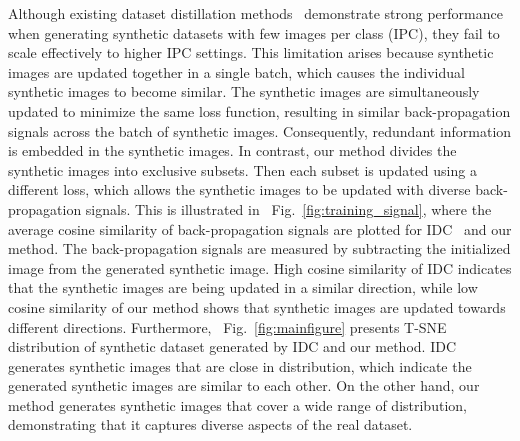 \documentclass{article}
\theoremstyle{plain}
\theoremstyle{definition}
\theoremstyle{remark}
\begin{document}
Although existing dataset distillation methods~\cite{} demonstrate strong performance when generating synthetic datasets with few images per class (IPC), they fail to scale effectively to higher IPC settings.
This limitation arises because synthetic images are updated together in a single batch, which causes the individual synthetic images to become similar. 
The synthetic images are simultaneously updated to minimize the same loss function, resulting in similar back-propagation signals across the batch of synthetic images. 
Consequently, redundant information is embedded in the synthetic images. In contrast, our method divides the synthetic images into exclusive subsets. 
Then each subset is updated using a different loss, which allows the synthetic images to be updated with diverse back-propagation signals. 
This is illustrated in ~Fig.~\ref{fig:training_signal}, where the average cosine similarity of back-propagation signals are plotted for IDC~\cite{} and our method. 
The back-propagation signals are measured by subtracting the initialized image from the generated synthetic image. 
High cosine similarity of IDC indicates that the synthetic images are being updated in a similar direction, while low cosine similarity of our method shows that synthetic images are updated towards different directions. 
Furthermore, ~Fig.~\ref{fig:mainfigure} presents T-SNE~\cite{} distribution of synthetic dataset generated by IDC and our method. 
IDC generates synthetic images that are close in distribution, which indicate the generated synthetic images are similar to each other. 
On the other hand, our method generates synthetic images that cover a wide range of distribution, demonstrating that it captures diverse aspects of the real dataset.

\end{document}
